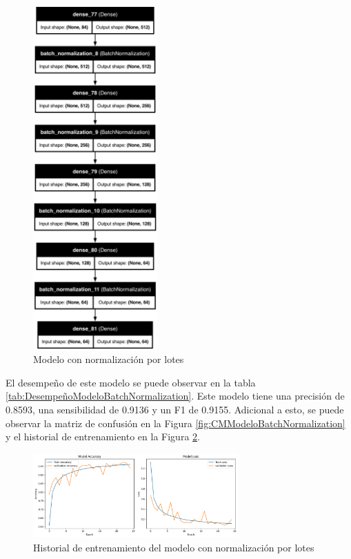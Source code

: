 \begin{figure}[H]
    \centering
    \includegraphics[width=0.425\textwidth]{figuras/modelBN.png}
    \caption{Modelo con normalización por lotes}
    \label{fig:ModeloBatchNormalization}
\end{figure}

El desempeño de este modelo se puede observar en la tabla \ref{tab:DesempeñoModeloBatchNormalization}.
Este modelo tiene una precisión de 0.8593, una sensibilidad de 0.9136 y un F1 de 0.9155.
Adicional a esto, se puede observar la matriz de confusión en la Figura \ref{fig:CMModeloBatchNormalization} y el historial de entrenamiento en la Figura \ref{fig:HistoryModeloBatchNormalization}.

\begin{figure}[H]
    \centering
    \includegraphics[width=0.7\textwidth]{figuras/modelBNHistory.png}
    \caption{Historial de entrenamiento del modelo con normalización por lotes}
    \label{fig:HistoryModeloBatchNormalization}
\end{figure}

